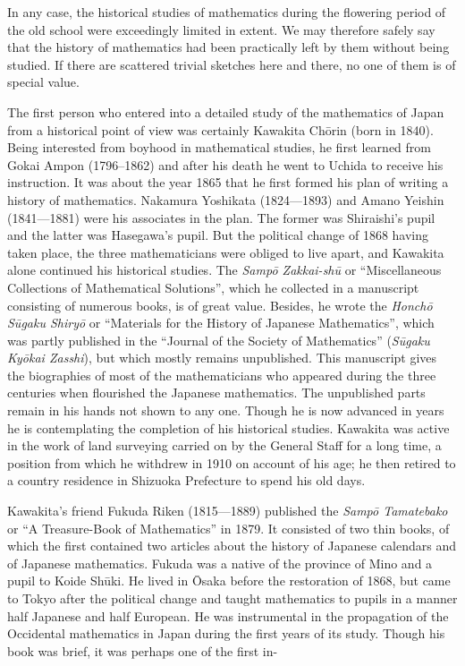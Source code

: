 \documentclass[11pt]{article}
\newcommand{\scanpage}[2]{\clearpage\setcounter{footnote}{0}\noindent{\footnotesize\color{gray}PDF page #1 · #2}\par\medskip}
\begin{document}
\scanpage{0340}{printed page 326}
In any case, the historical studies of mathematics during the flowering period of the old school were exceedingly limited in extent. We may therefore safely say that the history of mathematics had been practically left by them without being studied. If there are scattered trivial sketches here and there, no one of them is of special value.

The first person who entered into a detailed study of the mathematics of Japan from a historical point of view was certainly Kawakita Chōrin (born in 1840). Being interested from boyhood in mathematical studies, he first learned from Gokai Ampon (1796--1862) and after his death he went to Uchida to receive his instruction. It was about the year 1865 that he first formed his plan of writing a history of mathematics. Nakamura Yoshikata (1824---1893) and Amano Yeishin (1841---1881) were his associates in the plan. The former was Shiraishi's pupil and the latter was Hasegawa's pupil. But the political change of 1868 having taken place, the three mathematicians were obliged to live apart, and Kawakita alone continued his historical studies. The \emph{Sampō Zakkai-shū} or ``Miscellaneous Collections of Mathematical Solutions'', which he collected in a manuscript consisting of numerous books, is of great value. Besides, he wrote the \emph{Honchō Sūgaku Shiryō} or ``Materials for the History of Japanese Mathematics'', which was partly published in the ``Journal of the Society of Mathematics'' (\emph{Sūgaku Kyōkai Zasshi}), but which mostly remains unpublished. This manuscript gives the biographies of most of the mathematicians who appeared during the three centuries when flourished the Japanese mathematics. The unpublished parts remain in his hands not shown to any one. Though he is now advanced in years he is contemplating the completion of his historical studies. Kawakita was active in the work of land surveying carried on by the General Staff for a long time, a position from which he withdrew in 1910 on account of his age; he then retired to a country residence in Shizuoka Prefecture to spend his old days.

Kawakita's friend Fukuda Riken (1815---1889) published the \emph{Sampō Tamatebako} or ``A Treasure-Book of Mathematics'' in 1879. It consisted of two thin books, of which the first contained two articles about the history of Japanese calendars and of Japanese mathematics. Fukuda was a native of the province of Mino and a pupil to Koide Shūki. He lived in Ōsaka before the restoration of 1868, but came to Tokyo after the political change and taught mathematics to pupils in a manner half Japanese and half European. He was instrumental in the propagation of the Occidental mathematics in Japan during the first years of its study. Though his book was brief, it was perhaps one of the first in-
\end{document}
